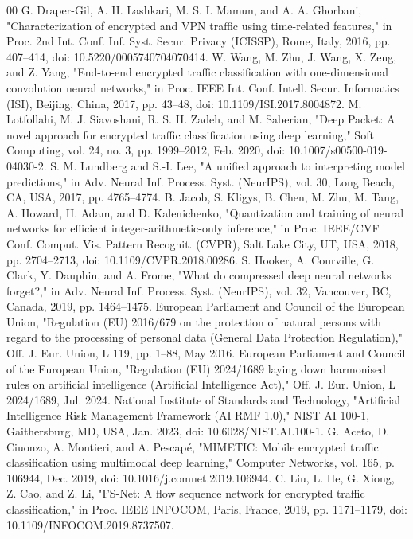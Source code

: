 \documentclass[conference]{IEEEtran}
\begin{document}
\begin{thebibliography}{00}
 G. Draper-Gil, A. H. Lashkari, M. S. I. Mamun, and A. A. Ghorbani, "Characterization of encrypted and VPN traffic using time-related features," in Proc. 2nd Int. Conf. Inf. Syst. Secur. Privacy (ICISSP), Rome, Italy, 2016, pp. 407–414, doi: 10.5220/0005740704070414.
 W. Wang, M. Zhu, J. Wang, X. Zeng, and Z. Yang, "End-to-end encrypted traffic classification with one-dimensional convolution neural networks," in Proc. IEEE Int. Conf. Intell. Secur. Informatics (ISI), Beijing, China, 2017, pp. 43–48, doi: 10.1109/ISI.2017.8004872.
 M. Lotfollahi, M. J. Siavoshani, R. S. H. Zadeh, and M. Saberian, "Deep Packet: A novel approach for encrypted traffic classification using deep learning," Soft Computing, vol. 24, no. 3, pp. 1999–2012, Feb. 2020, doi: 10.1007/s00500-019-04030-2.
 S. M. Lundberg and S.-I. Lee, "A unified approach to interpreting model predictions," in Adv. Neural Inf. Process. Syst. (NeurIPS), vol. 30, Long Beach, CA, USA, 2017, pp. 4765–4774.
 B. Jacob, S. Kligys, B. Chen, M. Zhu, M. Tang, A. Howard, H. Adam, and D. Kalenichenko, "Quantization and training of neural networks for efficient integer-arithmetic-only inference," in Proc. IEEE/CVF Conf. Comput. Vis. Pattern Recognit. (CVPR), Salt Lake City, UT, USA, 2018, pp. 2704–2713, doi: 10.1109/CVPR.2018.00286.
 S. Hooker, A. Courville, G. Clark, Y. Dauphin, and A. Frome, "What do compressed deep neural networks forget?," in Adv. Neural Inf. Process. Syst. (NeurIPS), vol. 32, Vancouver, BC, Canada, 2019, pp. 1464–1475.
 European Parliament and Council of the European Union, "Regulation (EU) 2016/679 on the protection of natural persons with regard to the processing of personal data (General Data Protection Regulation)," Off. J. Eur. Union, L 119, pp. 1–88, May 2016.
 European Parliament and Council of the European Union, "Regulation (EU) 2024/1689 laying down harmonised rules on artificial intelligence (Artificial Intelligence Act)," Off. J. Eur. Union, L 2024/1689, Jul. 2024.
 National Institute of Standards and Technology, "Artificial Intelligence Risk Management Framework (AI RMF 1.0)," NIST AI 100-1, Gaithersburg, MD, USA, Jan. 2023, doi: 10.6028/NIST.AI.100-1.
 G. Aceto, D. Ciuonzo, A. Montieri, and A. Pescapé, "MIMETIC: Mobile encrypted traffic classification using multimodal deep learning," Computer Networks, vol. 165, p. 106944, Dec. 2019, doi: 10.1016/j.comnet.2019.106944.
 C. Liu, L. He, G. Xiong, Z. Cao, and Z. Li, "FS-Net: A flow sequence network for encrypted traffic classification," in Proc. IEEE INFOCOM, Paris, France, 2019, pp. 1171–1179, doi: 10.1109/INFOCOM.2019.8737507.

\end{thebibliography}
\end{document}
